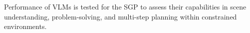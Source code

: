 Performance of VLMs is tested for the SGP to assess their capabilities in scene understanding, problem-solving, and multi-step planning within constrained environments.

